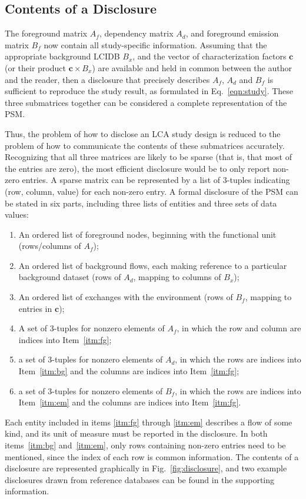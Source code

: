 \subsection{Contents of a Disclosure}

The foreground matrix $A_f$, dependency matrix $A_d$, and foreground emission matrix $B_f$ now contain all study-specific information.  Assuming that the appropriate background LCIDB $B_x$, and the vector of characterization factors $\mathbf{c}$ (or their product $\mathbf{c}\times B_x$) are available and held in common between the author and the reader, then a disclosure that precisely describes $A_f$, $A_d$ and $B_f$ is sufficient to reproduce the study result, as formulated in Eq.~\ref{eqn:study}.  These three submatrices together can be considered a complete representation of the PSM.


Thus, the problem of how to disclose an LCA study design is reduced to the problem of how to communicate the contents of these submatrices accurately.  Recognizing that all three matrices are likely to be sparse (that is, that most of the entries are zero), the most efficient disclosure would be to only report non-zero entries.  A sparse matrix can be represented by a list of 3-tuples indicating (row, column, value) for each non-zero entry.  A formal disclosure of the PSM can be stated in six parts, including three lists of entities and three sets of data values:
\begin{enumerate}[label={\em d-\roman*}., ref={\em d-\roman*}]
\item\label{itm:fg} An ordered list of foreground nodes, beginning with the functional unit (rows/columns of $A_f$);
\item\label{itm:bg} An ordered list of background flows, each making reference to a particular background dataset (rows of $A_d$, mapping to columns of $B_x$);
\item\label{itm:em} An ordered list of exchanges with the environment (rows of $B_f$, mapping to entries in $\mathbf{c}$);
\item\label{itm:af} A set of 3-tuples for nonzero elements of $A_f$, in which the row and column are indices into Item~\ref{itm:fg};
\item\label{itm:ad} a set of 3-tuples for nonzero elements of $A_d$, in which the rows are indices into Item~\ref{itm:bg} and the columns are indices into Item~\ref{itm:fg};
\item\label{itm:bf} a set of 3-tuples for nonzero elements of $B_f$, in which the rows are indices into Item~\ref{itm:em} and the columns are indices into Item~\ref{itm:fg}.
\end{enumerate}
Each entity included in items \ref{itm:fg} through \ref{itm:em} describes a flow of some kind, and its unit of measure must be reported in the disclosure.
In both items~\ref{itm:bg} and~\ref{itm:em}, only rows containing non-zero entries need to be mentioned, since the index of each row is common information.  The contents of a disclosure are represented graphically in Fig.~\ref{fig:disclosure}, and two example disclosures drawn from reference databases can be found in the supporting information.

